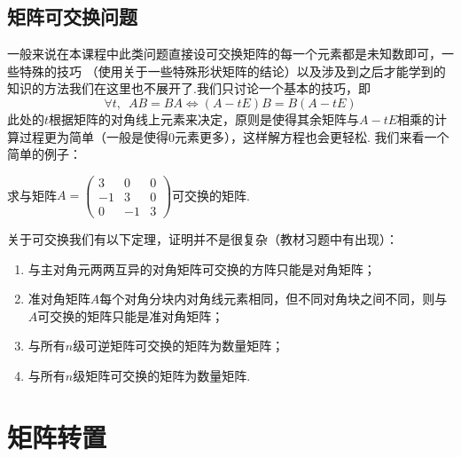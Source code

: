 \subsection{矩阵可交换问题}
一般来说在本课程中此类问题直接设可交换矩阵的每一个元素都是未知数即可，一些特殊的技巧
（使用关于一些特殊形状矩阵的结论）以及涉及到之后才能学到的知识的方法我们在这里也不展开了.我们只讨论一个基本的技巧，即
\[\forall t,\enspace AB=BA \iff (A-tE)B=B(A-tE)\]
此处的$t$根据矩阵的对角线上元素来决定，原则是使得其余矩阵与$A-tE$相乘的计算过程更为简单（一般是使得0元素更多），这样解方程也会更轻松.
我们来看一个简单的例子：
\begin{example}
    求与矩阵$A=\begin{pmatrix}
        3 & 0 & 0 \\ -1 & 3 & 0 \\ 0 & -1 & 3
    \end{pmatrix}$可交换的矩阵.
\end{example}

关于可交换我们有以下定理，证明并不是很复杂（教材习题中有出现）：
\begin{theorem}
    \begin{enumerate}
        \item 与主对角元两两互异的对角矩阵可交换的方阵只能是对角矩阵；

        \item 准对角矩阵$A$每个对角分块内对角线元素相同，但不同对角块之间不同，则与$A$可交换的矩阵只能是准对角矩阵；

        \item 与所有$n$级可逆矩阵可交换的矩阵为数量矩阵；

        \item 与所有$n$级矩阵可交换的矩阵为数量矩阵.
    \end{enumerate}
\end{theorem}

\section{矩阵转置}
